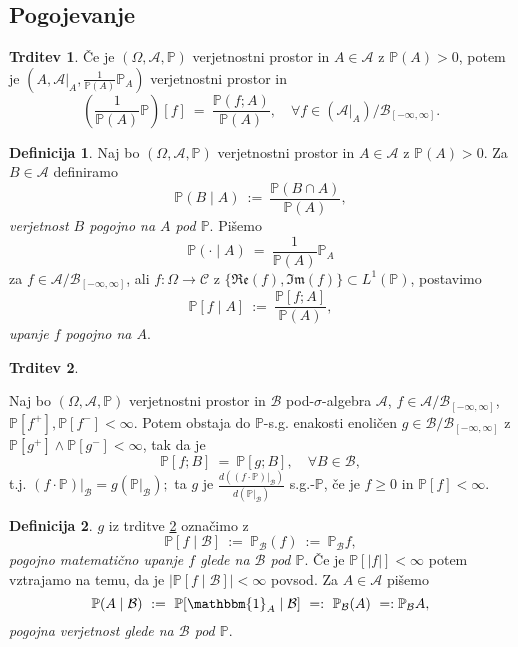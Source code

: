 \documentclass[11pt]{article}
\renewcommand{\P}{\mathbb{P}}
\newcommand{\A}{\mathcal{A}}
\newcommand{\BB}{\mathcal{B}}
\newcommand{\B}{\mathscr{B}}
\newcommand{\C}{\mathcal{C}}
\newcommand{\set}[1]{\{#1\}}
\newcommand{\oklepaj}[1]{\left(#1\right)}
\newcommand{\1}{\mathbbm{1}}
\newcommand{\rr}{[-\infty,\infty]}
\renewcommand{\Re}{\mathfrak{Re}}
\renewcommand{\Im}{\mathfrak{Im}}
\theoremstyle{definition}
\newtheorem{definicija}{Definicija}[section]
\theoremstyle{definition}
\newtheorem{trditev}{Trditev}[section]
\theoremstyle{definition}
\theoremstyle{definition}
\begin{document}

\subsection{Pogojevanje}
\vspace{0.5cm}

\begin{trditev}

Če je $(\Omega, \A, \P)$ verjetnostni prostor in $A \in \A$ z $\P(A)>0$, potem je $(A, \A\big|_A, \frac{1}{\P(A)}\P_A)$ verjetnostni prostor in
$$\oklepaj{\frac{1}{\P(A)}\P}[f] ~=~ \frac{\P(f;A)}{\P(A)}, \quad \forall f \in \oklepaj{\A\big|_A}/\B_{\rr}.$$

\end{trditev}
\vspace{0.5cm}

\begin{definicija}

Naj bo $(\Omega, \A, \P)$ verjetnostni prostor in $A \in \A$ z $\P(A)>0$. Za $B \in \A$ definiramo
$$\P(B \mid A) ~:=~ \frac{\P(B \cap A)}{\P(A)},$$
\textit{verjetnost $B$ pogojno na $A$ pod $\P$}. Pišemo
$$\P(\cdot \mid A) ~=~ \frac{1}{\P(A)}\P_A$$
za $f \in \A/\B_{\rr}$, ali $f: \Omega \rightarrow \C$ z $\set{\Re(f), \Im(f)} \subset L^1(\P)$, postavimo
$$\P[f \mid A] ~:=~ \frac{\P[f;A]}{\P(A)},$$
\textit{upanje $f$ pogojno na $A$}.

\end{definicija}
\vspace{0.5cm}

\begin{trditev}\label{ref:3.10}

Naj bo $(\Omega, \A, \P)$ verjetnostni prostor in $\BB$ pod-$\sigma$-algebra $\A$, $f \in \A/\B_{\rr}$, $\P[f^+],\P[f^-]<\infty$. Potem obstaja do $\P$-s.g. enakosti enoličen $g \in \BB/\B_{\rr}$ z $\P[g^+]\wedge\P[g^-]<\infty$, tak da je
$$\P[f;B] ~=~ \P[g;B], \quad \forall B \in \BB,$$
t.j. $(f\cdot\P)\big|_\BB = g(\P\big|_\BB);$ ta $g$ je $\frac{d\oklepaj{(f\cdot\P)\big|_\BB}}{d\oklepaj{\P\big|_\BB}}$ s.g.-$\P$, če je $f\geq 0$ in $\P[f]<\infty$.

\end{trditev}
\vspace{0.5cm}

\begin{definicija}

$g$ iz trditve \ref{ref:3.10} označimo z 
$$\P[f \mid \BB] ~:=~ \P_\BB(f) ~:=~ \P_\BB f,$$ 
\textit{pogojno matematično upanje $f$ glede na $\BB$ pod $\P$}. Če je $\P[|f|]<\infty$ potem vztrajamo na temu, da je $|\P[f \mid \BB]|<\infty$ povsod. Za $A \in \A$ pišemo
$$\P(A \mid \BB) ~:=~ \P[\1_A \mid \BB] ~=:~ \P_\BB(A) ~=: \P_\BB A,$$
\textit{pogojna verjetnost glede na $\BB$ pod $\P$}. 

\end{definicija}
\vspace{0.5cm}
\end{document}
